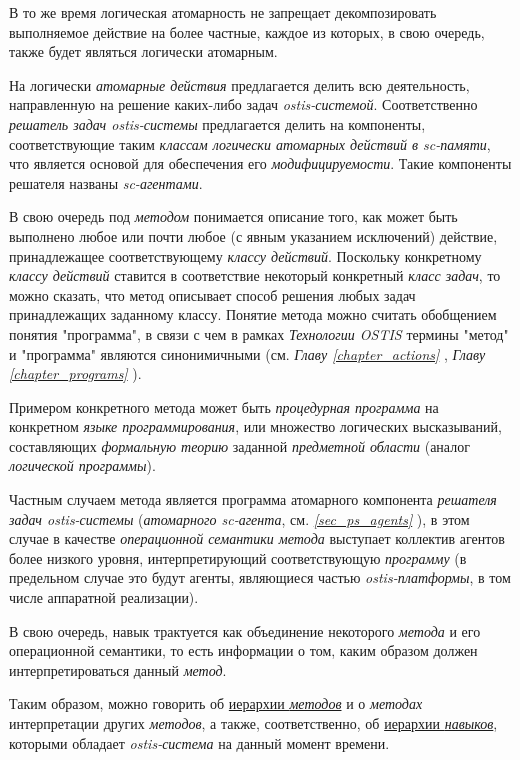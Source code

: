 В то же время логическая атомарность не запрещает декомпозировать выполняемое действие на более частные, каждое из которых, в свою очередь, также будет являться логически атомарным.
	
На логически \textit{атомарные действия} предлагается делить всю деятельность, направленную на решение каких-либо задач \textit{ostis-системой}. Соответственно \textit{решатель задач ostis-системы} предлагается делить на компоненты, соответствующие таким \textit{классам логически атомарных действий в sc-памяти}, что является основой для обеспечения его \textit{модифицируемости}. Такие компоненты решателя названы \textit{sc-агентами}.

В свою очередь под \textit{методом} понимается описание того, как может быть выполнено любое или почти любое (с явным указанием исключений) действие, принадлежащее соответствующему \textit{классу действий}. Поскольку конкретному \textit{классу действий} ставится в соответствие некоторый конкретный \textit{класс задач}, то можно сказать, что метод описывает способ решения любых задач принадлежащих заданному классу. Понятие метода можно считать обобщением понятия "программа"{}, в связи с чем в рамках \textit{Технологии OSTIS} термины "метод"{} и "программа"{} являются синонимичными (см. \textit{Главу \ref{chapter_actions} }, \textit{Главу \ref{chapter_programs} }).

Примером конкретного метода может быть \textit{процедурная программа} на конкретном \textit{языке программирования}, или множество логических высказываний, составляющих \textit{формальную теорию} заданной \textit{предметной области} (аналог \textit{логической программы}). 

Частным случаем метода является программа атомарного компонента \textit{решателя задач ostis-системы} (\textit{атомарного sc-агента}, см. \textit{\ref{sec_ps_agents} }), в этом случае в качестве \textit{операционной семантики метода} выступает коллектив агентов более низкого уровня, интерпретирующий соответствующую \textit{программу} (в предельном случае это будут агенты, являющиеся частью \textit{ostis-платформы}, в том числе аппаратной реализации).

В свою очередь, навык трактуется как объединение некоторого \textit{метода} и его операционной семантики, то есть информации о том, каким образом должен интерпретироваться данный \textit{метод}.

Таким образом, можно говорить об \underline{иерархии \textit{методов}} и о \textit{методах} интерпретации других \textit{методов}, а также, соответственно, об \underline{иерархии \textit{навыков}}, которыми обладает \textit{ostis-система} на данный момент времени.

